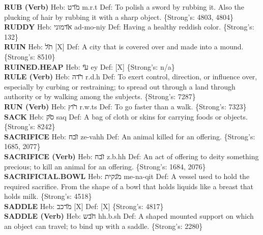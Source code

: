 {\textbf{RUB (Verb)} Heb: {\large\H מרט} m.r.t Def: To polish a sword by rubbing it. Also the plucking of hair by rubbing it with a sharp object. \{Strong's: 4803, 4804\}\hfill{}\\

\textbf{RUDDY} Heb: {\large\H אדמוני} ad-mo-niy Def: Having a healthy reddish color. \{Strong's: 132\}\hfill{}\\

\textbf{RUIN} Heb: {\large\H תל} {[}X{]} Def: A city that is covered over and made into a mound. \{Strong's: 8510\}\hfill{}\\

\textbf{RUINED.HEAP} Heb: {\large\H עי} ey Def: {[}X{]} \{Strong's: n/a\}\hfill{}\\

\textbf{RULE (Verb)} Heb: {\large\H רדה} r.d.h Def: To exert control, direction, or influence over, especially by curbing or restraining; to spread out through a land through authority or by walking among the subjects. \{Strong's: 7287\}\hfill{}\\

\textbf{RUN (Verb)} Heb: {\large\H רוץ} r.w.ts Def: To go faster than a walk. \{Strong's: 7323\}\hfill{}\\

\textbf{SACK} Heb: {\large\H סק} saq Def: A bag of cloth or skins for carrying foods or objects. \{Strong's: 8242\}\hfill{}\\

\textbf{SACRIFICE} Heb: {\large\H זבח} ze-vahh Def: An animal killed for an offering. \{Strong's: 1685, 2077\}\hfill{}\\

\textbf{SACRIFICE (Verb)} Heb: {\large\H זבח} z.b.hh Def: An act of offering to deity something precious; to kill an animal for an offering. \{Strong's: 1684, 2076\}\hfill{}\\

\textbf{SACRIFICIAL.BOWL} Heb: {\large\H מנקית} me-na-qit Def: A vessel used to hold the required sacrifice. From the shape of a bowl that holds liquids like a breast that holds milk. \{Strong's: 4518\}\hfill{}\\

\textbf{SADDLE} Heb: {\large\H מרכב} {[}X{]} Def: {[}X{]} \{Strong's: 4817\}\hfill{}\\

\textbf{SADDLE (Verb)} Heb: {\large\H חבש} hh.b.sh Def: A shaped mounted support on which an object can travel; to bind up with a saddle. \{Strong's: 2280\}\hfill{}\\

}
